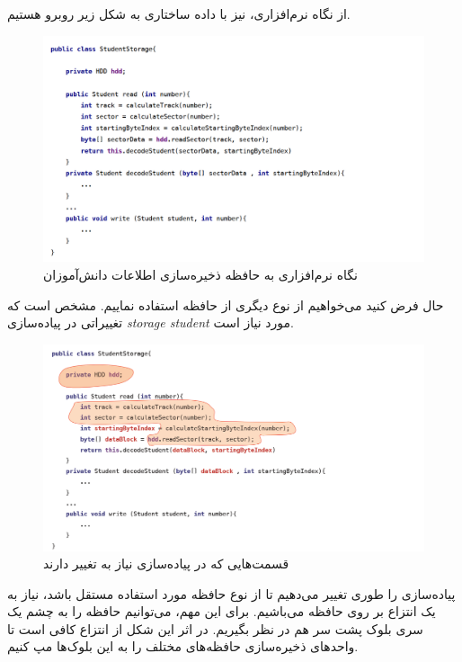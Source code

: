 \begin{flushright}
    از نگاه نرم‌افزاری، نیز با داده ساختاری به شکل زیر روبرو هستیم.

    \begin{figure}[H]
        \centering
        \includegraphics[scale=0.41]{source/student-storage-model-1}
        \caption{نگاه نرم‌افزاری به حافظه ذخیره‌سازی اطلاعات دانش‌آموزان}
        \label{fig:student-storage-model-1}
    \end{figure}

    حال فرض کنید می‌خواهیم از نوع دیگری از حافظه استفاده نماییم.
    مشخص است که تغییراتی در پیاده‌سازی \emph{storage student} مورد نیاز است.

    \begin{figure}[H]
        \centering
        \includegraphics[scale=0.41]{source/student-storage-model-1-hardcoded}
        \caption{قسمت‌هایی که در پیاده‌سازی نیاز به تغییر دارند}
        \label{fig:student-storage-model-1-hardcoded}
    \end{figure}


    پیاده‌سازی را طوری تغییر می‌دهیم تا از نوع حافظه مورد استفاده مستقل باشد، نیاز به یک انتزاع بر روی حافظه می‌باشیم.
    برای این مهم، می‌توانیم حافظه را به چشم یک سری بلوک پشت سر هم در نظر بگیریم.
    در اثر این شکل از انتزاع کافی است تا واحد‌های ذخیره‌سازی حافظه‌های مختلف را به این بلوک‌ها مپ کنیم.


\end{flushright}
